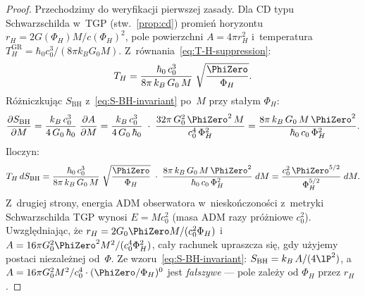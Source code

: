 \begin{proof}
Przechodzimy do weryfikacji pierwszej zasady. Dla CD typu
Schwarzschilda w~TGP (stw.~\ref{prop:cd})
promie\'n horyzontu $r_H = 2G(\Phi_H)M/c(\Phi_H)^2$,
pole powierzchni $A = 4\pi r_H^2$ i~temperatura
$T_H^{\mathrm{GR}} = \hbar_0 c_0^3/(8\pi k_B G_0 M)$.
Z~r\'ownania~\eqref{eq:T-H-suppression}:
\begin{equation}
    T_H = \frac{\hbar_0\,c_0^3}{8\pi\,k_B\,G_0\,M}
          \;\sqrt{\frac{\PhiZero}{\Phi_H}}.
\end{equation}
R\'o\.zniczkuj\k{a}c $S_{\mathrm{BH}}$
z~\eqref{eq:S-BH-invariant} po~$M$ przy sta\l{}ym $\Phi_H$:
\begin{equation}
    \frac{\partial S_{\mathrm{BH}}}{\partial M}
    = \frac{k_B\,c_0^3}{4\,G_0\,\hbar_0}\;\frac{\partial A}{\partial M}
    = \frac{k_B\,c_0^3}{4\,G_0\,\hbar_0}\;\cdot\;
      \frac{32\pi\,G_0^2\,\PhiZero^2\,M}{c_0^4\,\Phi_H^2}
    = \frac{8\pi\,k_B\,G_0\,M\,\PhiZero^2}
           {\hbar_0\,c_0\,\Phi_H^2}.
\end{equation}
Iloczyn:
\begin{equation}
    T_H\,dS_{\mathrm{BH}}
    = \frac{\hbar_0\,c_0^3}{8\pi\,k_B\,G_0\,M}
      \;\sqrt{\frac{\PhiZero}{\Phi_H}}
      \;\cdot\;
      \frac{8\pi\,k_B\,G_0\,M\,\PhiZero^2}
           {\hbar_0\,c_0\,\Phi_H^2}\;dM
    = \frac{c_0^2\,\PhiZero^{5/2}}{\Phi_H^{5/2}}\;dM.
\end{equation}
Z~drugiej strony, energia ADM obserwatora w~niesko\'nczono\'sci
z~metryki Schwarzschilda TGP wynosi $E = Mc_0^2$
(masa ADM razy pr\'o\.zniowe $c_0^2$).
Uwzgl\k{e}dniaj\k{a}c, \.ze $r_H = 2G_0\PhiZero M/(c_0^2\Phi_H)$
i~$A = 16\pi G_0^2\PhiZero^2 M^2/(c_0^4\Phi_H^2)$, ca\l{}y
rachunek upraszcza si\k{e}, gdy u\.zyjemy postaci niezale\.znej
od~$\Phi$. Ze wzoru~\eqref{eq:S-BH-invariant}:
$S_{\mathrm{BH}} = k_B\,A/(4\lP^2)$,
a~$A = 16\pi G_0^2 M^2/c_0^4 \cdot (\PhiZero/\Phi_H)^0$
jest \emph{fa\l{}szywe} --- pole zale\.zy od $\Phi_H$ przez $r_H$.


\end{proof}
